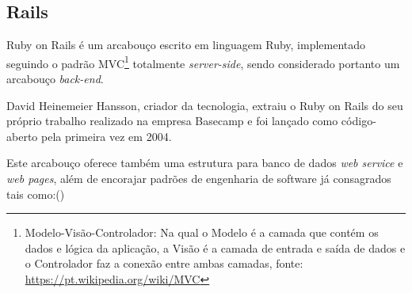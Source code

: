 \subsection{Rails}

\par Ruby on Rails é um arcabouço escrito em linguagem Ruby, implementado seguindo o padrão MVC\footnote{Modelo-Visão-Controlador: Na qual o Modelo é a camada que contém os dados e lógica da aplicação, a Visão é a camada de entrada e saída de dados e o Controlador faz a conexão entre ambas camadas, fonte: \url{https://pt.wikipedia.org/wiki/MVC} } totalmente \emph{server-side}, sendo considerado portanto um arcabouço \emph{ back-end}.
\par David Heinemeier Hansson, criador da tecnologia, extraiu o Ruby on Rails do seu próprio trabalho realizado na empresa Basecamp e foi lançado como código-aberto pela primeira vez em 2004.
\par Este arcabouço oferece também uma estrutura para banco de dados \emph{web service} e \emph{web pages}, além de encorajar padrões de engenharia de software já consagrados tais como:(\cite{railswiki})
